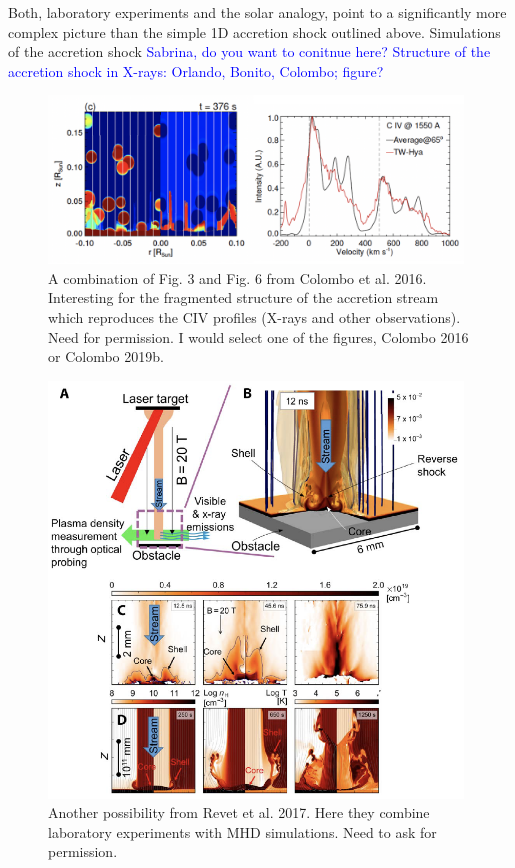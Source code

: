 Both, laboratory experiments and the solar analogy, point to a significantly more complex picture than the simple 1D accretion shock outlined above. Simulations of the accretion shock \textcolor{blue}{Sabrina, do you want to conitnue here? Structure of the accretion shock in X-rays: Orlando, Bonito, Colombo; figure?}

\begin{figure}
    \centering
    \includegraphics[width=11cm]{figs/colombo2016.png}
    \caption{A combination of Fig. 3 and Fig. 6 from Colombo et al. 2016. Interesting for the fragmented structure of the accretion stream which reproduces the CIV profiles (X-rays and other observations). Need for permission. I would select one of the figures, Colombo 2016 or Colombo 2019b.}
    \label{fig:colombo2016}
\end{figure}

\begin{figure}
    \centering
    \includegraphics[width=11cm]{figs/Revet2017.png}
    \caption{Another possibility from Revet et al. 2017. Here they combine laboratory experiments with MHD simulations. Need to ask for permission.}
    \label{fig:revet2017}
\end{figure}
